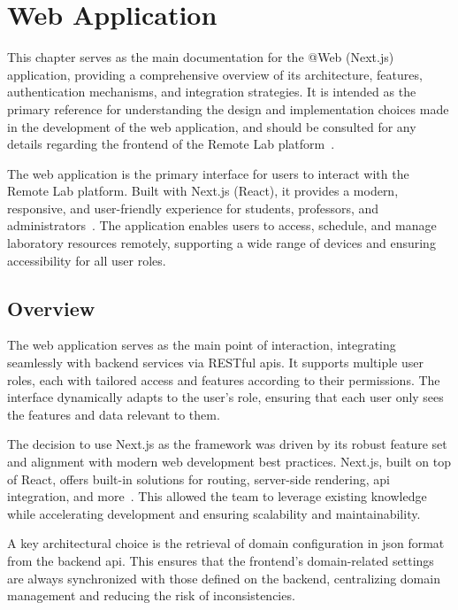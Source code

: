 \chapter{Web Application} \label{cap:web_app}

This chapter serves as the main documentation for the @Web (Next.js) application, providing a comprehensive overview of its architecture, features, authentication mechanisms, and integration strategies. It is intended as the primary reference for understanding the design and implementation choices made in the development of the web application, and should be consulted for any details regarding the frontend of the Remote Lab platform~\cite{nextjs-docs}.

The web application is the primary interface for users to interact with the Remote Lab platform. Built with Next.js (React), it provides a modern, responsive, and user-friendly experience for students, professors, and administrators~\cite{nextjs-docs}. The application enables users to access, schedule, and manage laboratory resources remotely, supporting a wide range of devices and ensuring accessibility for all user roles.

\section{Overview}
The web application serves as the main point of interaction, integrating seamlessly with backend services via RESTful \ac{api}s. It supports multiple user roles, each with tailored access and features according to their permissions. The interface dynamically adapts to the user's role, ensuring that each user only sees the features and data relevant to them.

The decision to use Next.js as the framework was driven by its robust feature set and alignment with modern web development best practices. Next.js, built on top of React, offers built-in solutions for routing, server-side rendering, \ac{api} integration, and more~\cite{nextjs-app-router,nextjs-server-client-components,nextjs-data-fetching,nextjs-api-routes}. This allowed the team to leverage existing knowledge while accelerating development and ensuring scalability and maintainability.

A key architectural choice is the retrieval of domain configuration in \ac{json} format from the backend \ac{api}. This ensures that the frontend's domain-related settings are always synchronized with those defined on the backend, centralizing domain management and reducing the risk of inconsistencies.

